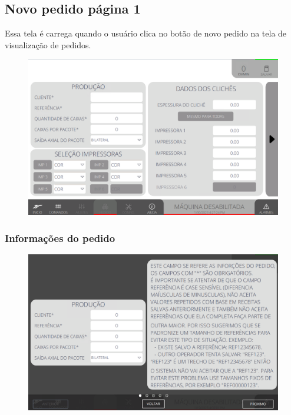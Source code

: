 \thispagestyle{fancy}
\vspace*{40 pt}
\subsection{Novo pedido página 1} \label{sec:telaNovoPedidoP1}
Essa tela é carrega quando o usuário clica no botão de novo pedido na tela de visualização de pedidos.
\vspace*{\fill}
\begin{figure}[h]
    \centering
    \includegraphics[width=480 px,height=300 px]{src/imagesICV/09-request/new/Tela-Principal.png}
\end{figure}
\vspace*{\fill}

\newpage
\thispagestyle{fancy}
\vspace*{40 pt}
\subsubsection{\small{Informações do pedido}} \label{sec:telaNovoPedidoP1InformacoesPedido}
\vspace*{\fill}
\begin{figure}[h]
    \centering
    \includegraphics[width=576 px,height=360 px]{src/imagesICV/09-request/new/e-1-COM-ERRO-DIGITAÇÃO.png}
\end{figure}
\vspace*{\fill}

